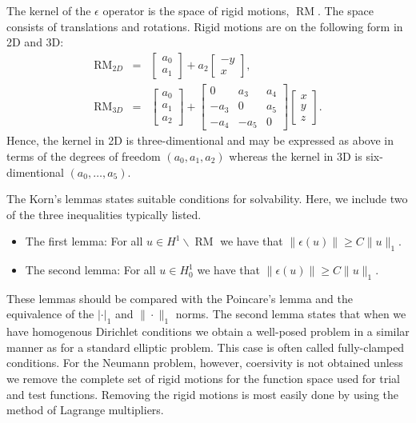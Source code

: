 The kernel of the $\epsilon$ operator is the space of rigid motions, $\operatorname{RM}$. The space consists of translations and rotations. Rigid motions
are on the following form in 2D and 3D:
\begin{eqnarray}
\operatorname{RM}_{2D} &=& \left[\begin{array}{c} a_0 \\ a_1 \end{array}\right] + a_2 \left[\begin{array}{c} -y\\ x\end{array} \right], \\
\operatorname{RM}_{3D} &=& \left[\begin{array}{c} a_0 \\ a_1 \\ a_2 \end{array}\right]
     + \left[\begin{array}{ccc} 0 & a_3 & a_4 \\
                               -a_3 & 0 & a_5\\
                               -a_4 & -a_5 & 0
             \end{array}\right]
 \left[\begin{array}{c}
x\\ y \\ z \end{array} \right].
\end{eqnarray}
Hence, the kernel in 2D is three-dimentional and may be expressed as above in terms of the degrees of freedom $(a_0, a_1, a_2)$ whereas the kernel in 3D is six-dimentional $(a_0, \ldots, a_5)$.

The Korn's lemmas states suitable conditions for solvability. Here, we include two of the three inequalities typically
listed.  
\begin{itemize}
\item The first lemma: For all $u\in H^1 \backslash \operatorname{RM}$ we have that $\|\epsilon(u)\| \ge C \|u\|_1$.
\item The second lemma: For all $u\in H^1_0 $ we have that $\|\epsilon(u)\| \ge C \|u\|_1$. 
\end{itemize}
These lemmas should be compared with the Poincare's lemma and the equivalence of the $|\cdot|_1$ and $\|\cdot\|_1$ norms.
The second lemma states that when we have homogenous Dirichlet conditions we obtain a well-posed problem
in a similar manner as for a standard elliptic problem. This case is often called fully-clamped conditions.
For the Neumann problem, however, coersivity is not obtained unless we remove the complete set of rigid motions
for the function space used for trial and test functions. Removing the rigid motions is most easily done
by using the method of Lagrange multipliers. 

